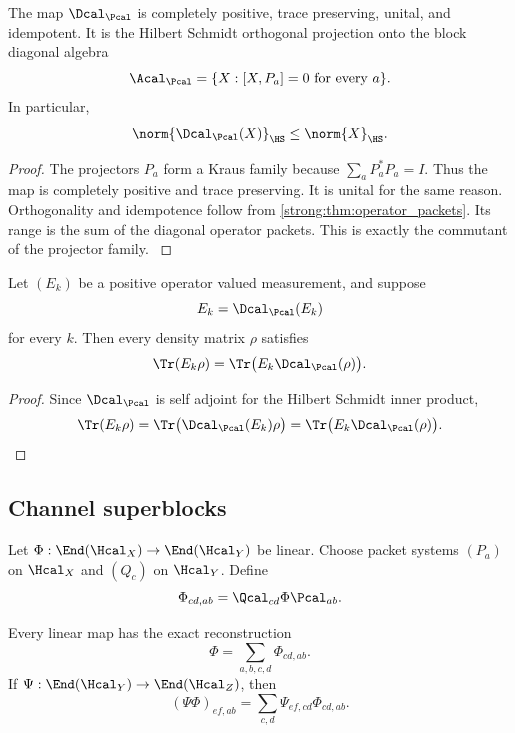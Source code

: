 \begin{theorem}\label{strong:theorem:020}\label{strong:thm:dephasing_expectation}
The map \(\Dcal_{\Pcal}\) is completely positive, trace preserving, unital, and idempotent. It is the Hilbert Schmidt orthogonal projection onto the block diagonal algebra
\[
\Acal_{\Pcal}
=
\{X:[X,P_a]=0\text{ for every }a\}.
\]
In particular,
\[
\norm{\Dcal_{\Pcal}(X)}_{\HS}
\leq
\norm{X}_{\HS}.
\]
\end{theorem}

\begin{proof}\label{strong:proof:030}
The projectors \(P_a\) form a Kraus family because \(\sum_aP_a^*P_a=I\). Thus the map is completely positive and trace preserving. It is unital for the same reason. Orthogonality and idempotence follow from \cref{strong:thm:operator_packets}. Its range is the sum of the diagonal operator packets. This is exactly the commutant of the projector family.
\label{strong:proof:030:end}\end{proof}

\begin{corollary}\label{strong:corollary:008}\label{strong:cor:measurement_invariance}
Let \((E_k)\) be a positive operator valued measurement, and suppose
\[
E_k=\Dcal_{\Pcal}(E_k)
\]
for every \(k\). Then every density matrix \(\rho\) satisfies
\[
\Tr(E_k\rho)
=
\Tr\bigl(E_k\Dcal_{\Pcal}(\rho)\bigr).
\]
\end{corollary}

\begin{proof}\label{strong:proof:031}
Since \(\Dcal_{\Pcal}\) is self adjoint for the Hilbert Schmidt inner product,
\[
\Tr(E_k\rho)
=
\Tr\bigl(\Dcal_{\Pcal}(E_k)\rho\bigr)
=
\Tr\bigl(E_k\Dcal_{\Pcal}(\rho)\bigr).
\]
\label{strong:proof:031:end}\end{proof}

\subsection{Channel superblocks}\label{strong:subsec:channel_blocks}

Let \(\Phi:\End(\Hcal_X)\to\End(\Hcal_Y)\) be linear. Choose packet systems \((P_a)\) on \(\Hcal_X\) and \((Q_c)\) on \(\Hcal_Y\). Define
\[
\Phi_{cd,ab}
=
\Qcal_{cd}\Phi\Pcal_{ab}.
\]

\begin{theorem}\label{strong:theorem:021}\label{strong:thm:channel_blocks}
Every linear map has the exact reconstruction
\[
\Phi=\sum_{a,b,c,d}\Phi_{cd,ab}.
\]
If \(\Psi:\End(\Hcal_Y)\to\End(\Hcal_Z)\), then
\[
(\Psi\Phi)_{ef,ab}
=
\sum_{c,d}
\Psi_{ef,cd}\Phi_{cd,ab}.
\]
\end{theorem}


